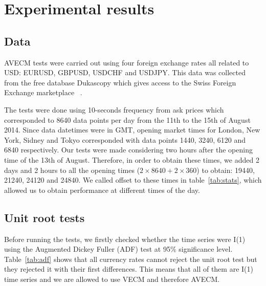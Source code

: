 \section{Experimental results}
\label{sec:results}
\subsection{Data} \label{sec:unitroot}
AVECM tests were carried out using four foreign exchange rates all related to
USD: EURUSD, GBPUSD, USDCHF and USDJPY. This data was collected from the free
database Dukascopy which gives access to the Swiss Foreign Exchange marketplace
~\cite{Dukascopy2014}.

The tests were done using 10-seconds frequency from ask prices which
corresponded to 8640 data points per day from the 11th to the 15th of August
2014. Since data datetimes were in GMT, opening market times for London, New
York, Sidney and Tokyo corresponded with data points 1440, 3240, 6120 and 6840
respectively. Our tests were made considering two hours after the opening time
of the 13th of August. Therefore, in order to obtain these times, we added 2
days and 2 hours to all the opening times ($2\times 8640 + 2 \times 360$) to obtain:
19440, 21240, 24120 and 24840. We called offset to these times in
table~\ref{tab:stats}, which allowed us to obtain performance at different
times of the day.

\subsection{Unit root tests} \label{sec:unitroot}
Before running the tests, we firstly checked whether the time series were
I(1) using the Augmented Dickey Fuller (ADF) test at 95\% significance level.
Table~\ref{tab:adf} shows that all currency rates cannot reject the unit root
test but they rejected it with their first differences. This means that all of
them are I(1) time series and we are allowed to use VECM and therefore AVECM.


